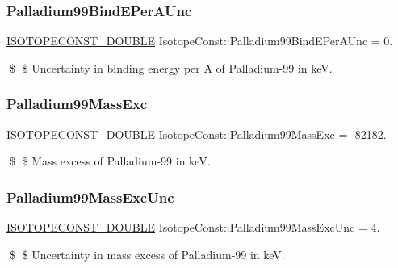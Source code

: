\subsubsection{\texorpdfstring{Palladium99\+Bind\+E\+Per\+A\+Unc}{Palladium99BindEPerAUnc}}
{\footnotesize\ttfamily \mbox{\hyperlink{group___isotope_const-_macros_ga8f45a7272ce02c0b4c65c44636ed719a}{I\+S\+O\+T\+O\+P\+E\+C\+O\+N\+S\+T\+\_\+\+D\+O\+U\+B\+LE}} Isotope\+Const\+::\+Palladium99\+Bind\+E\+Per\+A\+Unc = 0.}

\$ \$ Uncertainty in binding energy per A of Palladium-\/99 in keV. \mbox{\label{group___isotope_const-_palladium-_pd99_gaa2800a8818e5cddc60134bd83082d86b}} 
\subsubsection{\texorpdfstring{Palladium99\+Mass\+Exc}{Palladium99MassExc}}
{\footnotesize\ttfamily \mbox{\hyperlink{group___isotope_const-_macros_ga8f45a7272ce02c0b4c65c44636ed719a}{I\+S\+O\+T\+O\+P\+E\+C\+O\+N\+S\+T\+\_\+\+D\+O\+U\+B\+LE}} Isotope\+Const\+::\+Palladium99\+Mass\+Exc = -\/82182.}

\$ \$ Mass excess of Palladium-\/99 in keV. \mbox{\label{group___isotope_const-_palladium-_pd99_ga4144ee4ab48333cee0453e1dbeb2758b}} 
\subsubsection{\texorpdfstring{Palladium99\+Mass\+Exc\+Unc}{Palladium99MassExcUnc}}
{\footnotesize\ttfamily \mbox{\hyperlink{group___isotope_const-_macros_ga8f45a7272ce02c0b4c65c44636ed719a}{I\+S\+O\+T\+O\+P\+E\+C\+O\+N\+S\+T\+\_\+\+D\+O\+U\+B\+LE}} Isotope\+Const\+::\+Palladium99\+Mass\+Exc\+Unc = 4.}

\$ \$ Uncertainty in mass excess of Palladium-\/99 in keV. \mbox{\label{group___isotope_const-_palladium-_pd99_gaccdbcdffaf992834ca158a00006fa7eb}} 
